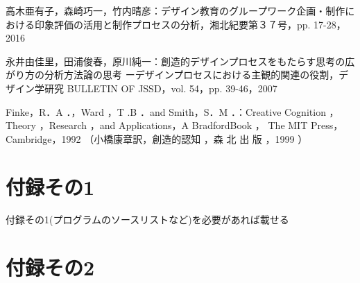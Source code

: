 \documentclass{funthesis}
\begin{document}
\begin{thebibliography}{9}
高木亜有子，森崎巧一，竹内晴彦：デザイン教育のグループワーク企画・制作における印象評価の活用と制作プロセスの分析，湘北紀要第３７号，pp. 17-28，2016

永井由佳里，田浦俊春，原川純一：創造的デザインプロセスをもたらす思考の広がり方の分析方法論の思考 ーデザインプロセスにおける主観的関連の役割，デザイン学研究 BULLETIN OF JSSD，vol. 54，pp. 39-46，2007

Finke，R．A ．，Ward ，T .B ．and Smith，S．M ．：Creative Cognition ， Theory ，Research ，and
Applications，A BradfordBook ， The MIT Press，
Cambridge，1992 （小橋康章訳，創造的認知 ，森 北 出
版 ，1999 ）






\end{thebibliography}


\appendix

\chapter*{付録その1} %

付録その1(プログラムのソースリストなど)を必要があれば載せる

\chapter*{付録その2}
\end{document}
